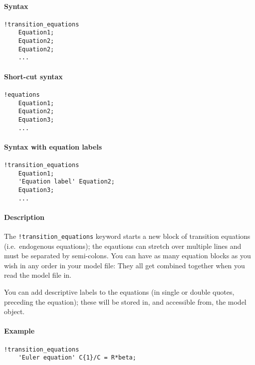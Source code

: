 


	\paragraph{Syntax}

\begin{verbatim}
!transition_equations
    Equation1;
    Equation2;
    Equation2;
    ...
\end{verbatim}

\paragraph{Short-cut syntax}

\begin{verbatim}
!equations
    Equation1;
    Equation2;
    Equation3;
    ...
\end{verbatim}

\paragraph{Syntax with equation
labels}

\begin{verbatim}
!transition_equations
    Equation1;
    'Equation label' Equation2;
    Equation3;
    ...
\end{verbatim}

\paragraph{Description}

The \texttt{!transition\_equations} keyword starts a new block of
transition equations (i.e.~endogenous equations); the eqautions can
stretch over multiple lines and must be separated by semi-colons. You
can have as many equation blocks as you wish in any order in your model
file: They all get combined together when you read the model file in.

You can add descriptive labels to the equations (in single or double
quotes, preceding the equation); these will be stored in, and accessible
from, the model object.

\paragraph{Example}

\begin{verbatim}
!transition_equations
    'Euler equation' C{1}/C = R*beta;
\end{verbatim}


